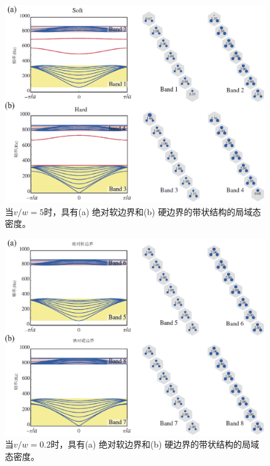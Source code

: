 \begin{figure}[h!]
  \centering
  \includegraphics[width=1\textwidth]{images/fig3-8.eps} 
  \caption{当\(v/w = 5\)时，具有(a) 绝对软边界和(b) 硬边界的带状结构的局域态密度。}
  \label{fig_3_8}
\end{figure}

\begin{figure}[h!]
  \centering
  \includegraphics[width=1\textwidth]{images/fig3-9.eps} 
  \caption{当\(v/w = 0.2\)时，具有(a) 绝对软边界和(b) 硬边界的带状结构的局域态密度。}
  \label{fig_3_9}
\end{figure}

